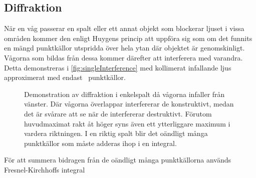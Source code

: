 \documentclass[a4paper]{article}
\begin{document}
\subsection{Diffraktion}

\FloatBarrier


När en våg passerar en spalt eller ett annat objekt som blockerar ljuset i vissa områden kommer den enligt Huygens princip att uppföra sig som om det funnits en mängd punktkällor utspridda över hela ytan där objektet är genomskinligt. Vågorna som bildas från dessa kommer därefter att interferera med varandra. Detta demonstreras i \autoref{fig:singleInterference} med kollimerat infallande ljus approximerat med endast \numSources~punktkällor.

\begin{figure}[ht]
	\centering
	\caption{Demonstration av diffraktion i enkelspalt då vågorna infaller från vänster. Där vågorna överlappar interfererar de konstruktivt, medan det är svårare att se när de interfererar destruktivt. Förutom huvudmaximat rakt åt höger syns även ett ytterliggare maximum i vardera riktningen. I en riktig spalt blir det oändligt många punktkällor som måste adderas ihop i en integral.}
	\label{fig:singleInterference}
\end{figure}

För att summera bidragen från de oändligt många punktkällorna används Fresnel-Kirchhoffs integral \cite[p.~330]{pearsonIntroOpt}
\end{document}
